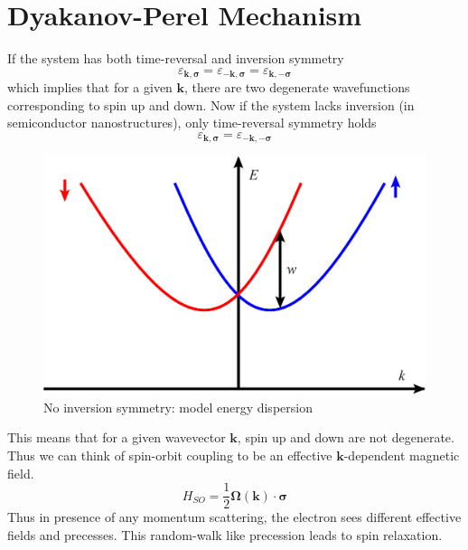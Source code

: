 \documentclass[aps,prb,onecolumn,notitlepage,showpacs,floatfix,superscriptaddress]{revtex4-1}
\begin{document}
\section{Dyakanov-Perel Mechanism}
If the system has both time-reversal and inversion symmetry
\begin{equation}
\varepsilon_{{\bm k},{\bm \sigma}}=\varepsilon_{-{\bm k},{\bm \sigma}}=\varepsilon_{{\bm k},-{\bm \sigma}}
\end{equation}
which implies that for a given ${\bm k}$, there are two degenerate wavefunctions corresponding to spin up and down. Now if the system lacks inversion (in semiconductor nanostructures), only time-reversal symmetry holds
\begin{equation}
\varepsilon_{{\bm k},{\bm \sigma}}=\varepsilon_{-{\bm k},-{\bm \sigma}}
\end{equation}
\begin{figure}
\includegraphics[scale=0.08]{DP_Ek.png} 
\caption{No inversion symmetry: model energy dispersion}
\end{figure}

This means that for a given wavevector ${\bm k}$, spin up and down are not degenerate. Thus we can think of spin-orbit coupling to be an effective ${\bm k}$-dependent magnetic field.
\begin{equation}
H_{SO}=\dfrac{1}{2} {\bm \Omega}({\bm k})\cdot{\bm \sigma}
\end{equation}
Thus in presence of any momentum scattering, the electron sees different effective fields and precesses. This random-walk like precession leads to spin relaxation.
\end{document}
